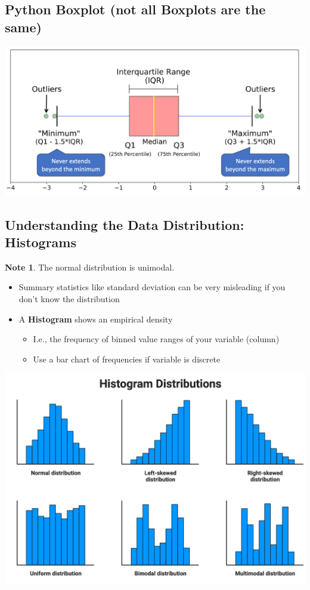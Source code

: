 \documentclass[11pt]{article}
\theoremstyle{definition}
\newtheorem{note}{Note}
\begin{document}
\subsection{Python Boxplot (not all Boxplots are the same)}
\includegraphics[width=\textwidth/2]{9.png}

\subsection{Understanding the Data Distribution: Histograms}
\begin{note}
    The normal distribution is unimodal.
\end{note}
\begin{itemize}
    \item Summary statistics
    like standard deviation
    can be very misleading if
    you don’t know the
    distribution
    \item A \textbf{Histogram} shows an
    empirical density
    \begin{itemize}
        \item I.e., the frequency of
        binned value ranges of
        your variable (column)
        \item Use a bar chart of
        frequencies if variable is
        discrete
    \end{itemize}
\end{itemize}
\includegraphics[width=\textwidth]{10.png}
\end{document}
